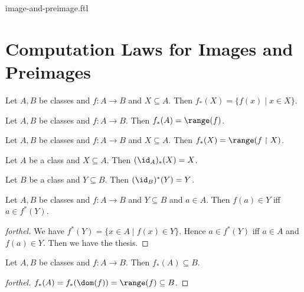 \documentclass{naproche-library}
\begin{document}
\begin{smodule}{image-and-preimage.ftl}

  \section*{Computation Laws for Images and Preimages}

  \begin{proposition}[forthel,id=FOUNDATIONS_07_5919649206108160,printid]
    Let $A, B$ be classes and $f : A \to B$ and $X \subseteq A$.
    Then $f_{*}(X) = \{ f(x) \mid x \in X \}$.
  \end{proposition}

  \begin{corollary}[forthel,id=FOUNDATIONS_07_5543924730953728,printid]
    Let $A, B$ be classes and $f : A \to B$.
    Then $f_{*}(A) = \range(f)$.
  \end{corollary}

  \begin{corollary}[forthel,id=FOUNDATIONS_07_1818812171157504,printid]
    Let $A, B$ be classes and $f : A \to B$ and $X \subseteq A$.
    Then $f_{*}(X) = \range(f \restriction X)$.
  \end{corollary}

  \begin{proposition}[forthel,id=FOUNDATIONS_07_911395830890496,printid]
    Let $A$ be a class and $X \subseteq A$.
    Then $(\id_{A})_{*}(X) = X$.
  \end{proposition}

  \begin{proposition}[forthel,id=FOUNDATIONS_07_3349817830932480,printid]
    Let $B$ be a class and $Y \subseteq B$.
    Then $(\id_{B})^{*}(Y) = Y$.
  \end{proposition}

  \begin{proposition}[forthel,id=FOUNDATIONS_07_6362984433582080,printid]
    Let $A, B$ be classes and $f : A \to B$ and $Y \subseteq B$ and $a \in A$.
    Then $f(a) \in Y$ iff $a \in f^{*}(Y)$.
  \end{proposition}
  \begin{proof}[forthel]
    We have $f^{*}(Y) = \{ x \in A \mid f(x) \in Y \}$.
    Hence $a \in f^{*}(Y)$ iff $a \in A$ and $f(a) \in Y$.
    Then we have the thesis.
  \end{proof}

  \begin{proposition}[forthel,id=FOUNDATIONS_07_6730546254184448,printid]
    Let $A, B$ be classes and $f : A \to B$.
    Then $f_{*}(A) \subseteq B$.
  \end{proposition}
  \begin{proof}[forthel]
    $f_{*}(A)
      = f_{*}(\dom(f))
      = \range(f)
      \subseteq B$.
  \end{proof}


\end{smodule}
\end{document}
